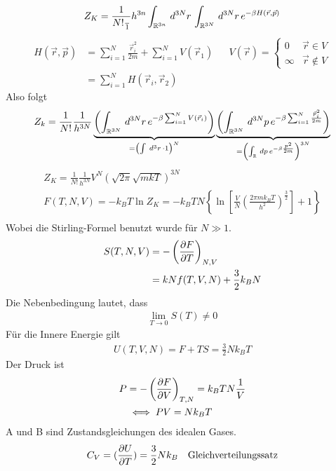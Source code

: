 %
\begin{align*}
  Z_K = \frac{1}{N!\frac{}1}{h^{3n}} \int_{\mathbb{R}^{3n}}^{} \,d^{3N}r\,
  \int_{\mathbb{R}^{3N}}^{} \,d^{3N}r\, e^{-\beta H (\vec{r}, \vec{p})} 
\end{align*}
%
%
\begin{align*}
  H(\vec{r}, \vec{p}) & = \sum_{i=1}^{ N} \frac{\vec{r}_i^2}{2m} +
  \sum_{i=1}^{N} V(\vec{r}_1) && V(\vec{r}) = \begin{cases}
  0 & \vec{r} \in V \\
  \infty & \vec{r} \not \in V
  \end{cases} 
  \\ & = \sum_{i=1}^{N} H(\vec{r}_i, \vec{r}_2)
\end{align*}
%
Also folgt %
\begin{align*}
  Z_k = \frac{1}{N!} \frac{1}{h^{3N}} \underbrace{\left(  \int_{\mathbb{R}^{3N}}^{}
  \,d^{3N} r\, e^{-\beta \sum_{i=1}^{N} V(\vec{r}_i)} \right)
}_{= \left( \int_{}^{} \,d^3r\,  \cdot 1 \right)^N}  \underbrace{\left( \int_{\mathbb{R}^{3N}}^{} \,d^{3N}p\, e^{-\beta \sum_{i=1}^{N} \frac{\vec{p}_i^2}{2m}} \right)
}_{= \left( \int_{\mathbb{R}}^{} \,dp\, e^{-\beta \frac{p^2}{2m}} \right)^{3N}}
\end{align*}
%
%
\begin{align*}
  Z_K = \frac{1}{N!} \frac{1}{h^{3N}} V^N \left( \sqrt{2 \pi} \sqrt{m k T} \right)^{3N} \\
  F(T, N, V) = -k_B T \ln{Z_K} = -k_B T N
  \left\{ \ln{ \left[ \frac{V}{N} (\frac{2 \pi m k_B T}{h^2})^\frac{3}{2} \right]
  + 1} \right\} \\ 
\end{align*}
%
Wobei die Stirling-Formel benutzt wurde f\"ur $N \gg 1$.
%
\begin{align*}
  S(T, N, V) & = - \left( \frac{\partial F }{\partial T} \right)_{N,V} \\
             & = k N f(T, V, N) + \frac{3}{2} k_B N
\end{align*}
%
Die Nebenbedingung lautet, dass
%
\begin{align*}
  \lim_{T\to  0 } S(T) \neq 0
\end{align*}
%
F\"ur die Innere Energie gilt
%
\begin{align}
  U(T, V, N) = F + TS = \frac{3}{2} N k_B T
  \label{eq:A}
\end{align}
%
Der Druck ist 
%
\begin{align}
  P & = - \left( \frac{\partial F }{\partial V} \right)_{T, N} = k_B T N \frac{1}{V} \\
    & \iff PV = N k_B T
  \label{eq:B}
\end{align}
%
A und B sind Zustandsgleichungen des idealen Gases.
%
\begin{align*}
  C_V = ( \frac{\partial U }{\partial T} ) = \frac{3}{2} N k_B && \text{Gleichverteilungssatz}
\end{align*}
%
